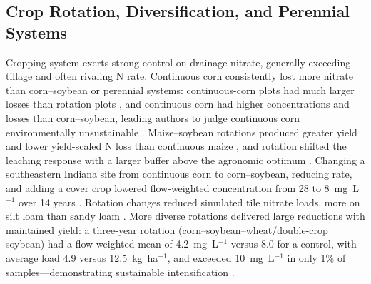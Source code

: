 \documentclass[11pt]{article}
\begin{document}
\subsection{Crop Rotation, Diversification, and Perennial Systems}

Cropping system exerts strong control on drainage nitrate, generally exceeding tillage and often rivaling N rate. Continuous corn consistently lost more nitrate than corn--soybean or perennial systems: continuous-corn plots had much larger losses than rotation plots \parencite{Weed1996}, and continuous corn had higher concentrations and losses than corn--soybean, leading authors to judge continuous corn environmentally unsustainable \parencite{Kanwar1997}. Maize--soybean rotations produced greater yield and lower yield-scaled N loss than continuous maize \parencite{Zhao2016}, and rotation shifted the leaching response with a larger buffer above the agronomic optimum \parencite{Pasley2021}. Changing a southeastern Indiana site from continuous corn to corn--soybean, reducing rate, and adding a cover crop lowered flow-weighted concentration from 28 to 8~mg~L$^{-1}$ over 14 years \parencite{Ritter2015}. Rotation changes reduced simulated tile nitrate loads, more on silt loam than sandy loam \parencite{Ahmed2007b}. More diverse rotations delivered large reductions with maintained yield: a three-year rotation (corn--soybean--wheat/double-crop soybean) had a flow-weighted mean of 4.2~mg~L$^{-1}$ versus 8.0 for a control, with average load 4.9 versus 12.5~kg~ha$^{-1}$, and exceeded 10~mg~L$^{-1}$ in only 1\% of samples---demonstrating sustainable intensification \parencite{Gentry2025}.
\end{document}
